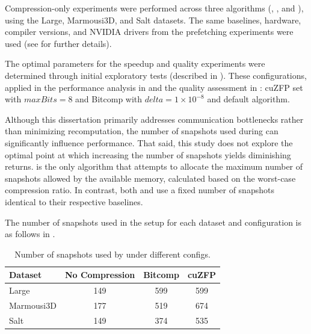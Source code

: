 \documentclass[Ingles,Final]{ic-tese-v3}
\begin{document}
Compression-only experiments were performed across three \checkpointing algorithms (\revolve, \zcut, and \uniform), using the Large, Marmousi3D, and Salt datasets. The same baselines, hardware, compiler versions, and NVIDIA drivers from the prefetching experiments were used (see  for further details).

The optimal \compression parameters for the speedup and quality experiments were determined through initial exploratory tests (described in ). These configurations, applied in the performance analysis in  and the quality assessment in : cuZFP set with $maxBits=8$ and Bitcomp with $delta=1\times10^{-8}$ and default algorithm.

Although this dissertation primarily addresses communication bottlenecks rather than minimizing recomputation, the number of snapshots used during \checkpointing can significantly influence performance. That said, this study does not explore the optimal point at which increasing the number of snapshots yields diminishing returns. \uniform is the only \checkpointing algorithm that attempts to allocate the maximum number of snapshots allowed by the available memory, calculated based on the worst-case compression ratio. In contrast, both \revolve and \zcut use a fixed number of snapshots identical to their respective baselines.

The number of snapshots used in the \uniform setup for each dataset and \compression configuration is as follows in .

\begin{table}[h!]
\centering
\begin{tabular}{|l|c|c|c|}
\hline
\rowcolor[HTML]{C0C0C0}
\textbf{Dataset} & \textbf{No Compression} & \textbf{Bitcomp} & \textbf{cuZFP} \\ \hline
Large           & 149                     & 599              & 599            \\ \hline
Marmousi3D      & 177                     & 519              & 674            \\ \hline
Salt            & 149                     & 374              & 535            \\ \hline
\end{tabular}
\caption[Number of snapshots used with \uniform (\compression)]{Number of snapshots used by \uniform under different \compression configs.}
\label{tab:uniform_snapshots}
\end{table}
\end{document}
